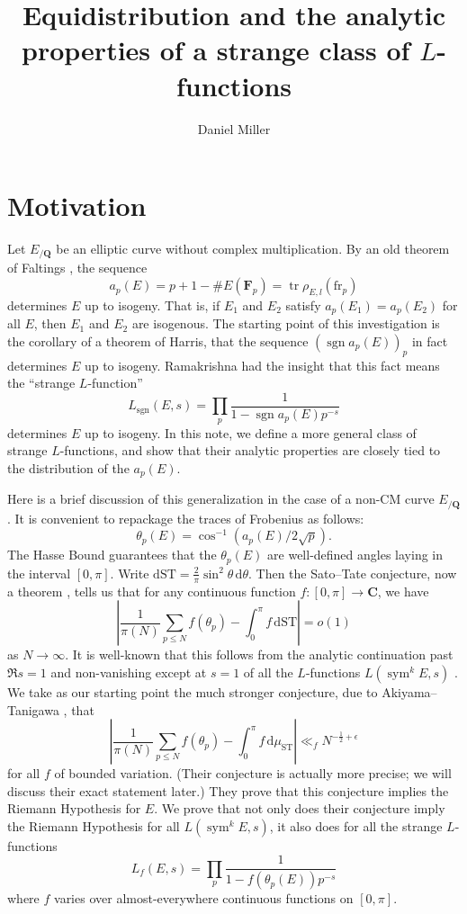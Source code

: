 \documentclass{article}
\title{Equidistribution and the analytic properties of a strange class of 
$L$-functions}
\author{Daniel Miller}
\DeclareMathOperator{\sgn}{sgn}
\DeclareMathOperator{\sym}{sym}
\DeclareMathOperator{\tr}{tr}
\newcommand{\bC}{\mathbf{C}}
\newcommand{\bF}{\mathbf{F}}
\newcommand{\bQ}{\mathbf{Q}}
\newcommand{\dd}{\mathrm{d}}
\newcommand{\fr}{\mathrm{fr}}
\newcommand{\ST}{\mathrm{ST}}
\theoremstyle{definition}
\begin{document}
\maketitle





\section{Motivation}

Let $E_{/\bQ}$ be an elliptic curve without complex multiplication. By an old 
theorem of Faltings \cite{faltings-1983}, the sequence 
\[
	a_p(E) = p + 1 - \# E(\bF_p) = \tr \rho_{E,l} (\fr_p)
\]
determines $E$ up to isogeny. That is, if $E_1$ and $E_2$ satisfy 
$a_p(E_1)=a_p(E_2)$ for all $E$, then $E_1$ and $E_2$ are isogenous. The 
starting point of this investigation is the 
corollary of a theorem of Harris, that the sequence $(\sgn a_p(E))_p$ in 
fact determines $E$ up to isogeny. Ramakrishna had the insight that this fact 
means the ``strange $L$-function''
\[
	L_{\sgn}(E,s) = \prod_p \frac{1}{1-\sgn a_p(E) p^{-s}} 
\]
determines $E$ up to isogeny. In this note, we define a more general class of 
strange $L$-functions, and show that their analytic properties are closely 
tied to the distribution of the $a_p(E)$. 

Here is a brief discussion of this generalization in the case of a non-CM curve 
$E_{/\bQ}$. It is convenient to repackage the traces of Frobenius as follows:
\[
	\theta_p(E) = \cos^{-1}(a_p(E)/2\sqrt p) .
\]
The Hasse Bound guarantees that the $\theta_p(E)$ are well-defined angles 
laying in the interval $[0,\pi]$. Write 
$\dd\ST = \frac{2}{\pi} \sin^2\theta\, \dd\theta$. Then the Sato--Tate 
conjecture, now a theorem \cite{barnet-lamb-etal-2011}, tells us that for any 
continuous function $f\colon [0,\pi]\to \bC$, we have
\[
	\left| \frac{1}{\pi(N)} \sum_{p\leqslant N} f(\theta_p) - \int_0^\pi f\, \dd\ST\right| = o(1)
\]
as $N\to \infty$. It is well-known that this follows from the analytic 
continuation past $\Re s=1$ and non-vanishing except at $s=1$ of all the 
$L$-functions $L(\sym^k E,s)$ \cite[A.1 Th.1]{serre-1968}. We take as our 
starting point the much stronger conjecture, due to Akiyama--Tanigawa 
\cite{akiyama-tanigawa}, that 
\[
	\left| \frac{1}{\pi(N)} \sum_{p\leqslant N} f(\theta_p) - \int_0^\pi f\, \dd \mu_\ST\right| \ll_f N^{-\frac 1 2+\epsilon}
\]
for all $f$ of bounded variation. (Their conjecture is actually more precise; 
we will discuss their exact statement later.)
They prove that this conjecture implies the Riemann Hypothesis for $E$. We 
prove that not only does their conjecture imply the Riemann Hypothesis for all 
$L(\sym^k E,s)$, it also does for all the strange $L$-functions 
\[
	L_f(E,s) = \prod_p \frac{1}{1-f(\theta_p(E)) p^{-s}}
\]
where $f$ varies over almost-everywhere continuous functions on $[0,\pi]$. 
\end{document}
